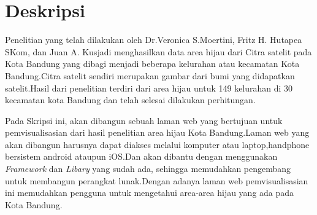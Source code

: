 \documentclass[a4paper,twoside]{article}
\begin{document}
\title{\@judultopik}
\author{\nama \textendash \@npm} 

\newcommand{\nama}{Bosnich Timothy Bonsaleng}
\newcommand{\@npm}{2017730086}
\newcommand{\@judultopik}{Pemvisualisasi Hasil Penelitian Area Hijau Kelurahan} %
\newcommand{\jumpemb}{1} %
\newcommand{\tanggal}{01/01/1900}


\maketitle


\section{Deskripsi}
Penelitian yang telah dilakukan oleh Dr.Veronica S.Moertini, Fritz H. Hutapea SKom, dan Juan A. Kusjadi menghasilkan data area hijau dari Citra satelit pada Kota Bandung yang dibagi menjadi beberapa kelurahan atau kecamatan Kota Bandung.Citra satelit sendiri merupakan gambar dari bumi yang didapatkan satelit.Hasil dari penelitian terdiri dari area hijau untuk 149 kelurahan di 30 kecamatan kota Bandung dan telah selesai dilakukan perhitungan.
 
Pada Skripsi ini, akan dibangun sebuah laman web yang bertujuan untuk pemvisualisasian dari hasil penelitian area hijau Kota Bandung.Laman web yang akan dibangun harusnya dapat diakses melalui komputer atau laptop,handphone bersistem android ataupun iOS.Dan akan dibantu dengan menggunakan \emph{Framework} dan \emph{Libary} yang sudah ada, sehingga memudahkan pengembang untuk membangun perangkat lunak.Dengan adanya laman web pemvisualisasian ini memudahkan pengguna untuk mengetahui area-area hijau yang ada pada Kota Bandung.

\end{document}
